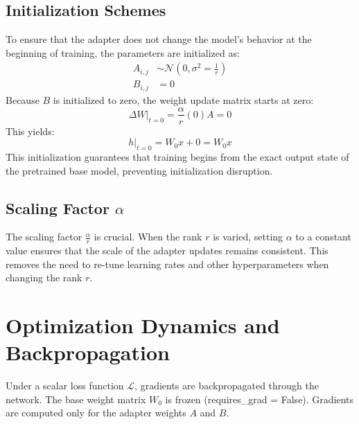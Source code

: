 \documentclass{article}
\begin{document}
\subsection{Initialization Schemes}
To ensure that the adapter does not change the model's behavior at the beginning of training, the parameters are initialized as:
\begin{align}
  A_{i,j} &\sim \mathcal{N}\left(0, \sigma^2 = \frac{1}{r}\right) \\
  B_{i,j} &= 0
\end{align}
Because $B$ is initialized to zero, the weight update matrix starts at zero:
\begin{equation}
  \Delta W\big|_{t=0} = \frac{\alpha}{r} (0) A = 0
\end{equation}
This yields:
\begin{equation}
  h\big|_{t=0} = W_0 x + 0 = W_0 x
\end{equation}
This initialization guarantees that training begins from the exact output state of the pretrained base model, preventing initialization disruption.

\subsection{Scaling Factor $\alpha$}
The scaling factor $\frac{\alpha}{r}$ is crucial. When the rank $r$ is varied, setting $\alpha$ to a constant value ensures that the scale of the adapter updates remains consistent. This removes the need to re-tune learning rates and other hyperparameters when changing the rank $r$.

\section{Optimization Dynamics and Backpropagation}
Under a scalar loss function $\mathcal{L}$, gradients are backpropagated through the network. The base weight matrix $W_0$ is frozen (requires\_grad = False). Gradients are computed only for the adapter weights $A$ and $B$.
\end{document}
